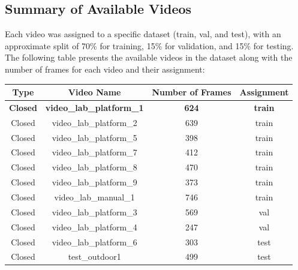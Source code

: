 \documentclass[12pt,oneside]{book} %
\begin{document}
\subsection{Summary of Available Videos}
Each video was assigned to a specific dataset (train, val, and test), with an
approximate split of 70\% for training, 15\% for validation, and 15\% for
testing. The following table presents the available videos in the dataset along
with the number of frames for each video and their assignment:

\begin{table}[H]
    \centering
    \begin{tabular}{@{}cccc@{}}
        \toprule
        \textbf{Type}      & \textbf{Video Name}                           & \textbf{Number of Frames} & \textbf{Assignment} \\ \midrule
        \textbf{Closed}    & \textbf{video\_lab\_platform\_1}              & \textbf{624}              & \textbf{train}      \\
        Closed             & video\_lab\_platform\_2                       & 639                       & train               \\
        Closed             & video\_lab\_platform\_5                       & 398                       & train               \\
        Closed             & video\_lab\_platform\_7                       & 412                       & train               \\
        Closed             & video\_lab\_platform\_8                       & 470                       & train               \\
        Closed             & video\_lab\_platform\_9                       & 373                       & train               \\
        Closed             & video\_lab\_manual\_1                         & 746                       & train               \\
        Closed             & video\_lab\_platform\_3                       & 569                       & val                 \\
        Closed             & video\_lab\_platform\_4                       & 247                       & val                 \\
        Closed             & video\_lab\_platform\_6                       & 303                       & test                \\
        Closed             & test\_outdoor1                                & 499                       & test                \\

\end{tabular}
\end{table}
\end{document}

